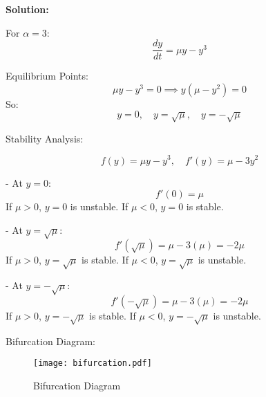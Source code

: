 \documentclass[12pt]{article}
\newenvironment{solution}{
    \textbf{Solution:}
    
}{
    
    \vspace{2em}
}
\begin{document}
\begin{solution}
\begin{enumerate}
        For \( \alpha = 3 \):
        \[
        \frac{dy}{dt} = \mu y - y^3
        \]
        
        Equilibrium Points:
        \[
        \mu y - y^3 = 0 \implies y(\mu - y^2) = 0
        \]
        So:
        \[
        y = 0, \quad y = \sqrt{\mu}, \quad y = -\sqrt{\mu}
        \]
        
        Stability Analysis:
        
        \[
        f(y) = \mu y - y^3, \quad f'(y) = \mu - 3y^2
        \]
        
        - At \( y = 0 \):
          \[
          f'(0) = \mu
          \]
          If \( \mu > 0 \), \( y = 0 \) is unstable. If \( \mu < 0 \), \( y = 0 \) is stable.
          
        - At \( y = \sqrt{\mu} \):
          \[
          f'\left(\sqrt{\mu}\right) = \mu - 3(\mu) = -2\mu
          \]
          If \( \mu > 0 \), \( y = \sqrt{\mu} \) is stable. If \( \mu < 0 \), \( y = \sqrt{\mu} \) is unstable.
        
          - At \( y = -\sqrt{\mu} \):
          \[
          f'\left(-\sqrt{\mu}\right) = \mu - 3(\mu) = -2\mu
          \]
          If \( \mu > 0 \), \( y = -\sqrt{\mu} \) is stable. If \( \mu < 0 \), \( y = -\sqrt{\mu} \) is unstable.
        
          Bifurcation Diagram:
        \begin{figure}[H]
            \centering
            \texttt{[image: bifurcation.pdf]}
            \caption{Bifurcation Diagram}
        \end{figure}
        
    \end{enumerate}
\end{solution}
\end{document}
